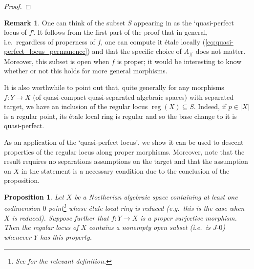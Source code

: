 \documentclass[11pt]{amsart}
\theoremstyle{plain}
\newtheorem{proposition}[theorem]{Proposition}
\theoremstyle{definition}
\newtheorem{remark}[theorem]{Remark}
\numberwithin{equation}{section}
\numberwithin{theorem}{section}
\begin{document}
\begin{proof}
\end{proof}

\begin{remark}
    One can think of the subset $S$ appearing in  as the `quasi-perfect locus of $f$'.
    It follows from the first part of the proof that in general, i.e.\ regardless of properness of $f$, one can compute it \'{e}tale locally (\cref{eq:quasi-perfect_locus_permanence}) and that the specific choice of $A_\#$ does not matter.
    Moreover, this subset is open when $f$ is proper; it would be interesting to know whether or not this holds for more general morphisms. 

    It is also worthwhile to point out that, quite generally for any morphisms $f\colon Y\to X$ (of quasi-compact quasi-separated algebraic spaces) with separated target, we have an inclusion of the regular locus $\operatorname{reg}(X)\subseteq S$.
    Indeed, if $p\in|X|$ is a regular point, its \'{e}tale local ring is regular and so the base change to it is quasi-perfect.
\end{remark}

As an application of the `quasi-perfect locus', we show it can be used to descent properties of the regular locus along proper morphisms.
Moreover, note that the result requires no separations assumptions on the target and that the assumption on $X$ in the statement is a necessary condition due to the conclusion of the proposition.

\begin{proposition}
    \label{prop:descending_open_in_regular_locus}
    Let $X$ be a Noetherian algebraic space containing at least one codimension $0$ point\footnote{See \cite[\href{https://stacks.math.columbia.edu/tag/04NA}{Tag 04NA}]{StacksProject} for the relevant definition.} whose \'{e}tale local ring is reduced (e.g.\ this is the case when $X$ is reduced).
    Suppose further that $f\colon Y \to X$ is a proper surjective morphism.
    Then the regular locus of $X$ contains a nonempty open subset (i.e.\ is $J\textrm{-}0$) whenever $Y$ has this property.
\end{proposition}
\end{document}
